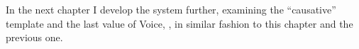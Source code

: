 In the next chapter I develop the system further, examining the ``causative'' template {\thif} and the last value of Voice, {\vd}, in similar fashion to this chapter and the previous one.





%
%
%
%
